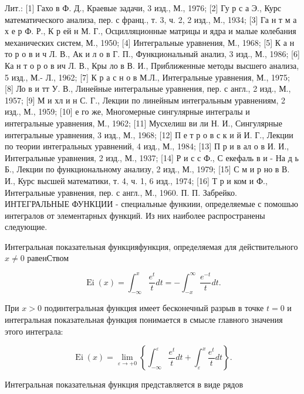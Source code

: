 \documentclass[10pt]{article}
\begin{document}
Лит.: [1] Гахо в Ф. Д., Краевые задачи, 3 изд., М., 1976; [2] Гу р с а Э., Курс математического анализа, пер. с франц., т. 3, ч. 2, 2 изд., М., 1934; [3] Га н т м а х е р Ф. Р., К р ей н М. Г., Осцилляционные матрицы и ядра и малые колебания механических систем, М., 1950; [4] Интегральные уравнения, М., 1968; [5] К а н то р о в и ч Л. В., Ак и л о в Г. П., Функциональный анализ, 3 изд., М., 1986; [6] Ка н т о р о в ич Л. В., Кры ло в В. И., Приближенные методы высшего анализа, 5 изд., М.- Л., 1962; [7] К р а с н о в М.Л., Интегральные уравнения, М., 1975; [8] Ло в и тт У. В., Линейные интегральные уравнения, пер. с англ., 2 изд., М., 1957; [9] М и хл и н С. Г., Лекции по линейным интегральным уравнениям, 2 изд., М., 1959; [10] е го же, Многомерные сингулярные интегралы и интегральные уравнения, М., 1962; [11] Мусхелиш ви ли Н. И., Сингулярные интегральные уравнения, 3 изд., М., 1968; [12] П е т р о в с к и й И. Г., Лекции по теории интегральных уравнений, 4 изд., М., 1984; [13] П р и в ал о в И. И., Интегральные уравнения, 2 изд., М., 1937; [14] Р и с с Ф., С екефаль в и - На д ь Б., Лекции по функциональному анализу, 2 изд., М., 1979; [15] С м и р но в В. И., Курс высшей математики, т. 4, ч. 1, 6 изд., 1974; [16] Т р и ком и Ф., Интегральные уравнения, пер. с англ., М., 1960. П. П. Забрейко. ИНТЕГРАЛЬНЫЕ ФУНКЦИИ - специальные функиии, определяемые с помошью интегралов от элементарных функций. Из них наиболее распространены следующие.



Интегральная показательная функцияфункция, определяемая для действительного $x \neq 0$ равенСтвом



\[

\operatorname{Ei}(x)=\int_{-\infty}^{x} \frac{e^{t}}{t} d t=-\int_{-x}^{\infty} \frac{e^{-t}}{t} d t .

\]



При $x>0$ подинтегральная функция имеет бесконечный разрыв в точке $t=0$ и интегральная показательная функция понимается в смысле главного значения этого интеграла:



\[

\operatorname{Ei}(x)=\lim _{\varepsilon \rightarrow+0}\left\{\int_{-\infty}^{\varepsilon} \frac{e^{t}}{t} d t+\int_{\varepsilon}^{x} \frac{e^{t}}{t} d t\right\} .

\]



Интегральная показательная функция представляется в виде рядов
\end{document}

